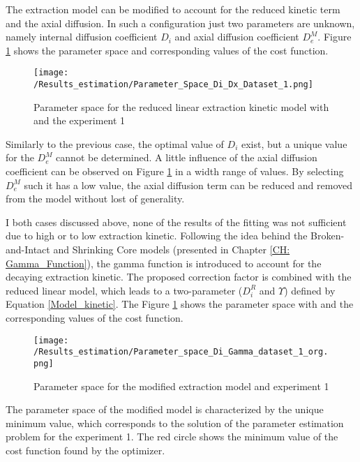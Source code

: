 \documentclass[../Supercritical_fluid_extraction_of_essential_oil_from_chamomile.tex]{subfiles}
\begin{document}
	The extraction model can be modified to account for the reduced kinetic term and the axial diffusion. In such a configuration just two parameters are unknown, namely internal diffusion coefficient $D_i$ and axial diffusion coefficient $D_e^M$. Figure \ref{fig: Fit_1_Di_Dx} shows the parameter space and corresponding values of the cost function.
	
	\begin{figure}[!h]
		\centering
		\texttt{[image: /Results\_estimation/Parameter\_Space\_Di\_Dx\_Dataset\_1.png]}
		\caption{Parameter space for the reduced linear extraction kinetic model with and the experiment 1}
		\label{fig: Fit_1_Di_Dx}
	\end{figure}
	
	Similarly to the previous case, the optimal value of $D_i$ exist, but a unique value for the $D_e^M$ cannot be determined. A little influence of the axial diffusion coefficient can be observed on Figure \ref{fig: Fit_1_Di_Dx} in a width range of values. By selecting $D_e^M$ such it has a low value, the axial diffusion term can be reduced and removed from the model without lost of generality.
	
	I both cases discussed above, none of the results of the fitting was not sufficient due to high or to low extraction kinetic. Following the idea behind the Broken-and-Intact and Shrinking Core models (presented in Chapter \ref{CH: Gamma_Function}), the gamma function is introduced to account for the decaying extraction kinetic. The proposed correction factor is combined with the reduced linear model, which leads to a two-parameter ($D_i^R$ and $\Upsilon$) defined by Equation \ref{Model_kinetic}. The Figure \ref{fig: Fit_1_Di_Dx} shows the parameter space with and the corresponding values of the cost function.
	
	\begin{figure}[!h]
		\centering
		\texttt{[image: /Results\_estimation/Parameter\_space\_Di\_Gamma\_dataset\_1\_org.png]}
		\caption{Parameter space for the modified extraction model and experiment 1}
		\label{fig: Fit_1_Di_Gamma}
	\end{figure}
	
	The parameter space of the modified model is characterized by the unique minimum value, which corresponds to the solution of the parameter estimation problem for the experiment 1. The red circle shows the minimum value of the cost function found by the optimizer. 
	
\end{document}
